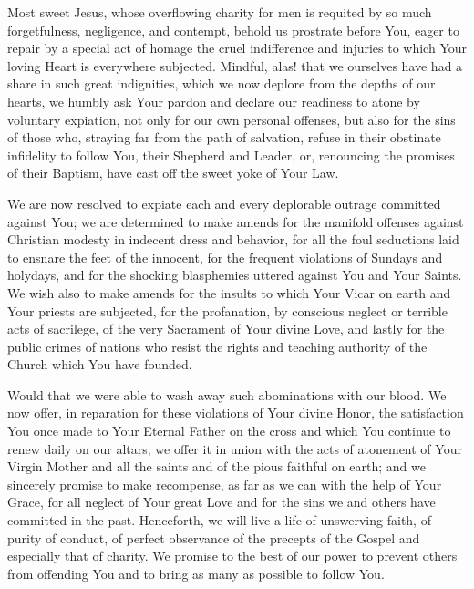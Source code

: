 Most sweet Jesus, whose overflowing charity for men is requited by so much forgetfulness, negligence, and contempt, behold us prostrate before You, eager to repair by a special act of homage the cruel indifference and injuries to which Your loving Heart is everywhere subjected.
Mindful, alas! that we ourselves have had a share in such great indignities, which we now deplore from the depths of our hearts, we humbly ask Your pardon and declare our readiness to atone by voluntary expiation, not only for our own personal offenses, but also for the sins of those who, straying far from the path of salvation, refuse in their obstinate infidelity to follow You, their Shepherd and Leader, or, renouncing the promises of their Baptism, have cast off the sweet yoke of Your Law.

We are now resolved to expiate each and every deplorable outrage committed against You; we are determined to make amends for the manifold offenses against Christian modesty in indecent dress and behavior, for all the foul seductions laid to ensnare the feet of the innocent, for the frequent violations of Sundays and holydays, and for the shocking blasphemies uttered against You and Your Saints.
We wish also to make amends for the insults to which Your Vicar on earth and Your priests are subjected, for the profanation, by conscious neglect or terrible acts of sacrilege, of the very Sacrament of Your divine Love, and lastly for the public crimes of nations who
resist the rights and teaching authority of the Church which You have founded.

Would that we were able to wash away such abominations with our blood.
We now offer, in reparation for these violations of Your divine Honor, the satisfaction You once made to Your Eternal Father on the cross and which You continue to renew daily on our altars;
we offer it in union with the acts of atonement of Your Virgin Mother and all the saints and of the pious faithful on earth;
and we sincerely promise to make recompense, as far as we can with the help of Your Grace, for all neglect of Your great Love and for the sins we and others have committed in the past.
Henceforth, we will live a life of unswerving faith, of purity of conduct, of perfect observance of the precepts of the Gospel and especially that of charity.
We promise to the best of our power to prevent others from offending You and to bring as many as possible to follow You.

